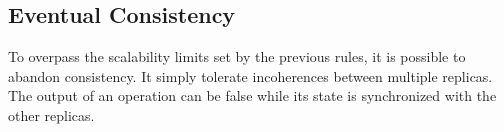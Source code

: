 \subsection{Eventual Consistency}

To overpass the scalability limits set by the previous rules, it is possible to abandon consistency.
It simply tolerate incoherences between multiple replicas.
The output of an operation can be false while its state is synchronized with the other replicas.




